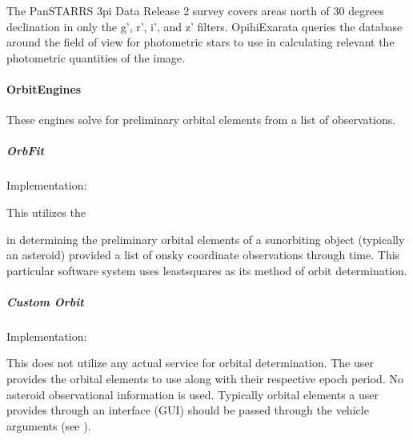 \documentclass[letterpaper,11pt,english]{sphinxmanual}
\begin{document}
\sphinxAtStartPar
The Pan\sphinxhyphen{}STARRS 3pi Data Release 2 survey covers areas north of \sphinxhyphen{}30
degrees declination in only the g’, r’, i’, and z’ filters. OpihiExarata
queries the database around the field of view for photometric stars to use in
calculating relevant the photometric quantities of the image.


\paragraph{OrbitEngines}
\label{\detokenize{technical/architecture/services_engines:orbitengines}}\label{\detokenize{technical/architecture/services_engines:technical-architecture-services-engines-orbitengines}}
\sphinxAtStartPar
These engines solve for preliminary orbital elements from a list of
observations.


\subparagraph{OrbFit}
\label{\detokenize{technical/architecture/services_engines:orbfit}}
\sphinxAtStartPar
Implementation: {\hyperref[\detokenize{code/opihiexarata.orbit.orbfit:opihiexarata.orbit.orbfit.OrbfitOrbitDeterminerEngine}]{}}

\sphinxAtStartPar
This utilizes the %
\begin{footnote}[46]\sphinxAtStartFootnote
{}
%
\end{footnote}
in determining the preliminary orbital elements of a sun\sphinxhyphen{}orbiting object
(typically an asteroid) provided a list of on\sphinxhyphen{}sky coordinate observations
through time. This particular software system uses least\sphinxhyphen{}squares as its method
of orbit determination.


\subparagraph{Custom Orbit}
\label{\detokenize{technical/architecture/services_engines:custom-orbit}}
\sphinxAtStartPar
Implementation: {\hyperref[\detokenize{code/opihiexarata.orbit.custom:opihiexarata.orbit.custom.CustomOrbitEngine}]{}}

\sphinxAtStartPar
This does not utilize any actual service for orbital determination. The user
provides the orbital elements to use along with their respective epoch period.
No asteroid observational information is used. Typically orbital elements a
user provides through an interface (GUI) should be passed through the
vehicle arguments (see {\hyperref[\detokenize{technical/architecture/services_engines:technical-architecture-services-engines}]{}}).
\end{document}
